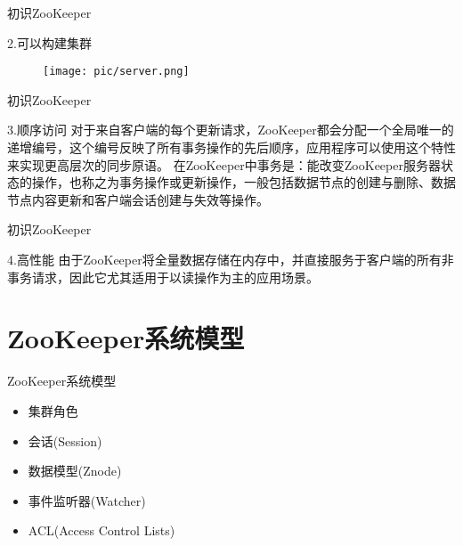 \documentclass[10pt]{beamer}
\begin{document}
\begin{frame}[fragile]{初识ZooKeeper}
  \begin{alertblock}{2.可以构建集群}
    \begin{figure}
      \begin{center}
        \texttt{[image: pic/server.png]}
      \end{center}
    \end{figure}
  \end{alertblock}
\end{frame}

\begin{frame}[fragile]{初识ZooKeeper}
  \begin{alertblock}{3.顺序访问}
    \newline
    对于来自客户端的每个更新请求，ZooKeeper都会分配一个全局唯一的递增编号，这个编号反映了所有事务操作的先后顺序，应用程序可以使用这个特性来实现更高层次的同步原语。\newline
    在ZooKeeper中事务是：能改变ZooKeeper服务器状态的操作，也称之为事务操作或更新操作，一般包括数据节点的创建与删除、数据节点内容更新和客户端会话创建与失效等操作。
  \end{alertblock}
\end{frame}

\begin{frame}[fragile]{初识ZooKeeper}
  \begin{alertblock}{4.高性能}
    \newline
    由于ZooKeeper将全量数据存储在内存中，并直接服务于客户端的所有非事务请求，因此它尤其适用于以读操作为主的应用场景。
  \end{alertblock}
\end{frame}
\section{ZooKeeper系统模型}

\begin{frame}[fragile]{ZooKeeper系统模型}
  \begin{itemize}
    \item 集群角色
    \item 会话(Session)
    \item 数据模型(Znode)
    \item 事件监听器(Watcher)
    \item ACL(Access Control Lists)%
  \end{itemize}
\end{frame}
\end{document}
